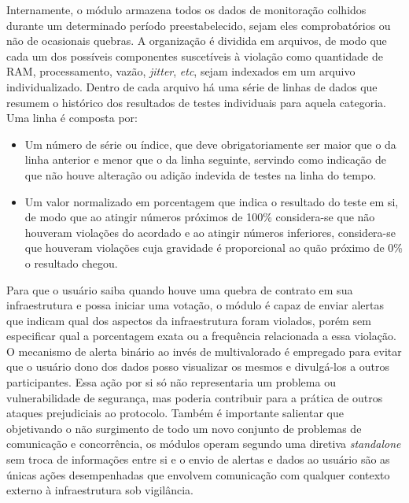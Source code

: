 %
Internamente, o módulo armazena todos os dados de monitoração colhidos durante um determinado período preestabelecido, sejam eles comprobatórios ou não de ocasionais quebras. A organização é dividida em arquivos, de modo que cada um dos possíveis componentes suscetíveis à violação como quantidade de RAM, processamento, vazão, \textit{jitter}, \textit{etc}, sejam indexados em um arquivo individualizado. Dentro de cada arquivo há uma série de linhas de dados que resumem o histórico dos resultados de testes individuais para aquela categoria. Uma linha é composta por:
\begin{itemize}
    \item Um número de série ou índice, que deve obrigatoriamente ser maior que o da linha anterior e menor que o da linha seguinte, servindo como indicação de que não houve alteração ou adição indevida de testes na linha do tempo.
    \item Um valor normalizado em porcentagem que indica o resultado do teste em si, de modo que ao atingir números próximos de 100\% considera-se que não houveram violações do acordado e ao atingir números inferiores, considera-se que houveram violações cuja gravidade é proporcional ao quão próximo de 0\% o resultado chegou.
\end{itemize}

Para que o usuário saiba quando houve uma quebra de contrato em sua infraestrutura e possa iniciar uma votação, o módulo é capaz de enviar alertas que indicam qual dos aspectos da infraestrutura foram violados, porém sem especificar qual a porcentagem exata ou a frequência relacionada a essa violação. O mecanismo de alerta binário ao invés de multivalorado é empregado para evitar que o usuário dono dos dados posso visualizar os mesmos e divulgá-los a outros participantes. Essa ação por si só não representaria um problema ou vulnerabilidade de segurança, mas poderia contribuir para a prática de outros ataques prejudiciais ao protocolo. Também é importante salientar que objetivando o não surgimento de todo um novo conjunto de problemas de comunicação e concorrência, os módulos operam segundo uma diretiva \textit{standalone} sem troca de informações entre si e o envio de alertas e dados ao usuário são as únicas ações desempenhadas que envolvem comunicação com qualquer contexto externo à infraestrutura sob vigilância. 


